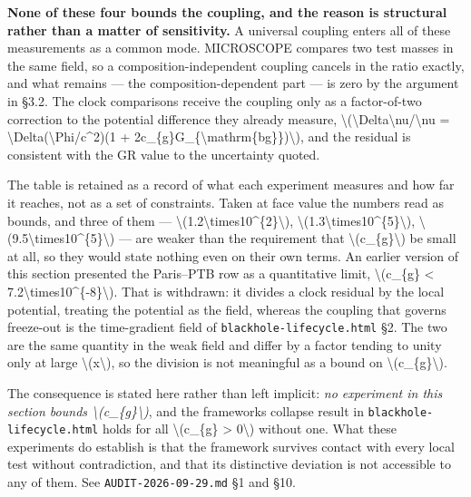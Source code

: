\documentclass[
  10pt,
]{article}
\begin{document}
\textbf{None of these four bounds the coupling, and the reason is
structural rather than a matter of sensitivity.} A universal coupling
enters all of these measurements as a common mode. MICROSCOPE compares
two test masses in the same field, so a composition-independent coupling
cancels in the ratio exactly, and what remains --- the
composition-dependent part --- is zero by the argument in §3.2. The
clock comparisons receive the coupling only as a factor-of-two
correction to the potential difference they already measure,
\textbackslash(\textbackslash Delta\textbackslash nu/\textbackslash nu =
\textbackslash Delta(\textbackslash Phi/c\^{}2)(1 +
2c\_\{g\}G\_\{\textbackslash mathrm\{bg\}\})\textbackslash), and the
residual is consistent with the GR value to the uncertainty quoted.

The table is retained as a record of what each experiment measures and
how far it reaches, not as a set of constraints. Taken at face value the
numbers read as bounds, and three of them ---
\textbackslash(1.2\textbackslash times10\^{}\{2\}\textbackslash),
\textbackslash(1.3\textbackslash times10\^{}\{5\}\textbackslash),
\textbackslash(9.5\textbackslash times10\^{}\{5\}\textbackslash) --- are
weaker than the requirement that \textbackslash(c\_\{g\}\textbackslash)
be small at all, so they would state nothing even on their own terms. An
earlier version of this section presented the Paris--PTB row as a
quantitative limit, \textbackslash(c\_\{g\} \textless{}
7.2\textbackslash times10\^{}\{-8\}\textbackslash). That is withdrawn:
it divides a clock residual by the local potential, treating the
potential as the field, whereas the coupling that governs freeze-out is
the time-gradient field of \texttt{blackhole-lifecycle.html} §2. The two
are the same quantity in the weak field and differ by a factor tending
to unity only at large \textbackslash(x\textbackslash), so the division
is not meaningful as a bound on \textbackslash(c\_\{g\}\textbackslash).

The consequence is stated here rather than left implicit: \emph{no
experiment in this section bounds
\textbackslash(c\_\{g\}\textbackslash)}, and the
framework\textquotesingle s collapse result in
\texttt{blackhole-lifecycle.html} holds for all \textbackslash(c\_\{g\}
\textgreater{} 0\textbackslash) without one. What these experiments do
establish is that the framework survives contact with every local test
without contradiction, and that its distinctive deviation is not
accessible to any of them. See \texttt{AUDIT-2026-09-29.md} §1 and §10.
\end{document}
